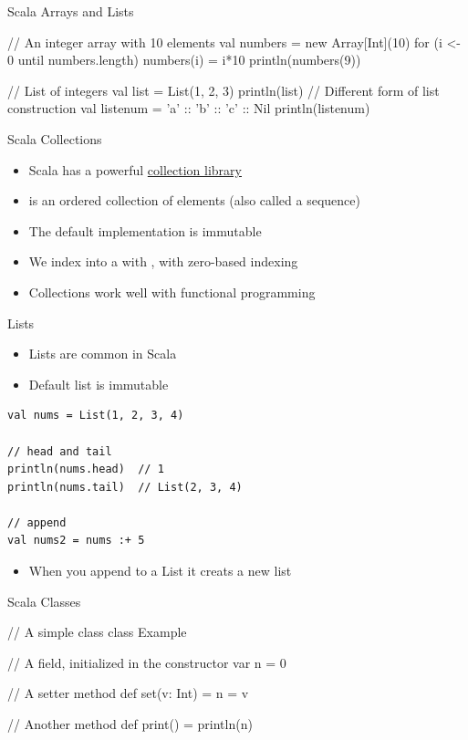 \begin{frame}[fragile]{Scala Arrays and Lists}
\begin{chisel}
// An integer array with 10 elements
val numbers = new Array[Int](10)
for (i <- 0 until numbers.length) {
  numbers(i) = i*10
}
println(numbers(9))


// List of integers
val list = List(1, 2, 3)
println(list)
// Different form of list construction
val listenum = 'a' :: 'b' :: 'c' :: Nil
println(listenum)
\end{chisel}
\end{frame}

\begin{frame}[fragile]{Scala Collections}
\begin{itemize}
\item Scala has a powerful \href{https://docs.scala-lang.org/overviews/collections-2.13/overview.html}{collection library}
\item {} is an ordered collection of elements (also called a sequence)
\item The default implementation is immutable
\item We index into a  with \code{()}, with zero-based indexing
\item Collections work well with functional programming
\end{itemize}
\end{frame}

\begin{frame}[fragile]{Lists}
\begin{itemize}
    \item Lists are common in Scala
    \item Default list is immutable
\end{itemize}

\begin{verbatim}
val nums = List(1, 2, 3, 4)

// head and tail
println(nums.head)  // 1
println(nums.tail)  // List(2, 3, 4)

// append
val nums2 = nums :+ 5
\end{verbatim}

\begin{itemize}
\item When you append to a List it creats a new list
\end{itemize}
\end{frame}

\begin{frame}[fragile]{Scala Classes}
\begin{chisel}
// A simple class
class Example {
  // A field, initialized in the constructor
  var n = 0
  
  // A setter method
  def set(v: Int) = {
    n = v
  }
  
  // Another method
  def print() = {
    println(n)
  }
}
\end{chisel}
\end{frame}

